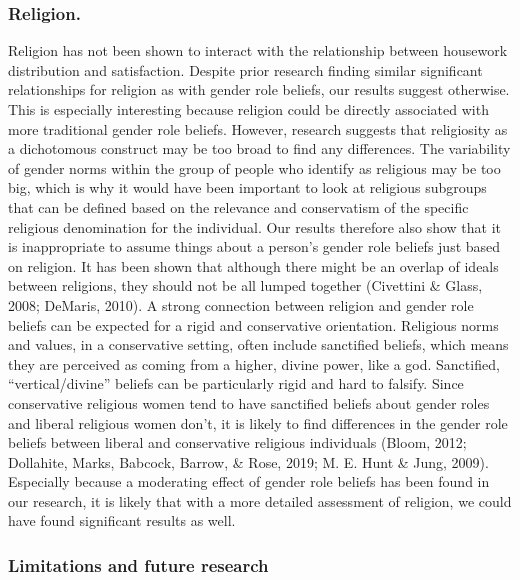 \documentclass[
  man,floatsintext]{apa6}
\begin{document}
\hypertarget{religion.}{%
\subsubsection{Religion.}\label{religion.}}

Religion has not been shown to interact with the relationship between housework distribution and satisfaction. Despite prior research finding similar significant relationships for religion as with gender role beliefs, our results suggest otherwise.
This is especially interesting because religion could be directly associated with more traditional gender role beliefs. However, research suggests that religiosity as a dichotomous construct may be too broad to find any differences. The variability of gender norms within the group of people who identify as religious may be too big, which is why it would have been important to look at religious subgroups that can be defined based on the relevance and conservatism of the specific religious denomination for the individual. Our results therefore also show that it is inappropriate to assume things about a person's gender role beliefs just based on religion. It has been shown that although there might be an overlap of ideals between religions, they should not be all lumped together (Civettini \& Glass, 2008; DeMaris, 2010).
A strong connection between religion and gender role beliefs can be expected for a rigid and conservative orientation. Religious norms and values, in a conservative setting, often include sanctified beliefs, which means they are perceived as coming from a higher, divine power, like a god. Sanctified, ``vertical/divine'' beliefs can be particularly rigid and hard to falsify. Since conservative religious women tend to have sanctified beliefs about gender roles and liberal religious women don't, it is likely to find differences in the gender role beliefs between liberal and conservative religious individuals (Bloom, 2012; Dollahite, Marks, Babcock, Barrow, \& Rose, 2019; M. E. Hunt \& Jung, 2009). Especially because a moderating effect of gender role beliefs has been found in our research, it is likely that with a more detailed assessment of religion, we could have found significant results as well.

\hypertarget{limitations-and-future-research}{%
\subsubsection{Limitations and future research}\label{limitations-and-future-research}}
\end{document}
